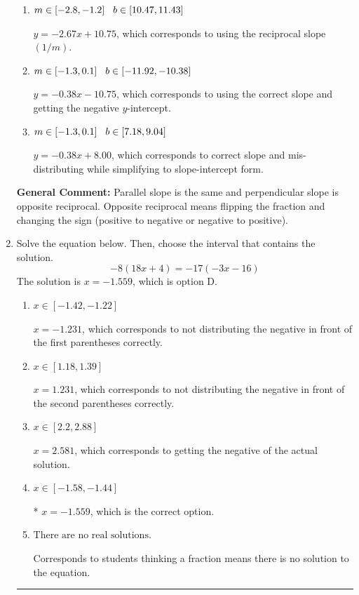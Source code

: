 \documentclass{extbook}[14pt]
\newcommand{\litem}[1]{\item #1

\rule{\textwidth}{0.4pt}}
\begin{document}
\begin{enumerate}
{\begin{enumerate}[label=\Alph*.]
 $y = 0.38x + 9.25$, which corresponds to using the negative slope.
\item \( m \in [-2.8, -1.2] \hspace*{3mm} b \in [10.47, 11.43] \)

 $y = -2.67x + 10.75$, which corresponds to using the reciprocal slope $(1/m)$.
\item \( m \in [-1.3, 0.1] \hspace*{3mm} b \in [-11.92, -10.38] \)

 $y = -0.38x - 10.75$, which corresponds to using the correct slope and getting the negative $y$-intercept.
\item \( m \in [-1.3, 0.1] \hspace*{3mm} b \in [7.18, 9.04] \)

 $y = -0.38x + 8.00$, which corresponds to correct slope and mis-distributing while simplifying to slope-intercept form.
\end{enumerate}

\textbf{General Comment:} Parallel slope is the same and perpendicular slope is opposite reciprocal. Opposite reciprocal means flipping the fraction and changing the sign (positive to negative or negative to positive).
}
\litem{
Solve the equation below. Then, choose the interval that contains the solution.
\[ -8(18x + 4) = -17(-3x -16) \]
The solution is \( x = -1.559 \), which is option D.\begin{enumerate}[label=\Alph*.]
\item \( x \in [-1.42, -1.22] \)

$x = -1.231$, which corresponds to not distributing the negative in front of the first parentheses correctly.
\item \( x \in [1.18, 1.39] \)

$x = 1.231$, which corresponds to not distributing the negative in front of the second parentheses correctly.
\item \( x \in [2.2, 2.88] \)

$x = 2.581$, which corresponds to getting the negative of the actual solution.
\item \( x \in [-1.58, -1.44] \)

* $x = -1.559$, which is the correct option.
\item \( \text{There are no real solutions.} \)

Corresponds to students thinking a fraction means there is no solution to the equation.
\end{enumerate}

}
\end{enumerate}
\end{document}
